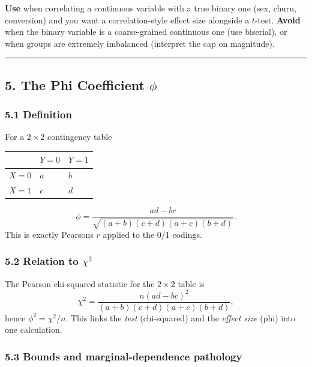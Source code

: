 \documentclass{article}
\begin{document}
\textbf{Use} when correlating a continuous variable with a true binary
one (sex, churn, conversion) and you want a correlation-style effect
size alongside a \(t\)-test. \textbf{Avoid} when the binary variable is
a coarse-grained continuous one (use biserial), or when groups are
extremely imbalanced (interpret the cap on magnitude).

\begin{center}\rule{0.5\linewidth}{0.5pt}\end{center}

\subsection{\texorpdfstring{5. The Phi Coefficient
\(\phi\)}{5. The Phi Coefficient \textbackslash phi}}\label{5-the-phi-coefficient-phi}

\subsubsection{5.1 Definition}\label{51-definition}

For a \(2 \times 2\) contingency table

{\def\LTcaptype{none} %
\begin{longtable}[]{@{}lll@{}}
\toprule\noalign{}
& \(Y = 0\) & \(Y = 1\) \\
\midrule\noalign{}
\endhead
\bottomrule\noalign{}
\endlastfoot
\(X = 0\) & \(a\) & \(b\) \\
\(X = 1\) & \(c\) & \(d\) \\
\end{longtable}
}

\[
\phi = \frac{ad - bc}{\sqrt{(a+b)(c+d)(a+c)(b+d)}}.
\] This is exactly Pearson\textquotesingle s \(r\) applied to the 0/1
codings.

\subsubsection{\texorpdfstring{5.2 Relation to
\(\chi^2\)}{5.2 Relation to \textbackslash chi\^{}2}}\label{52-relation-to-chi2}

The Pearson chi-squared statistic for the \(2 \times 2\) table is \[
\chi^2 = \frac{n(ad - bc)^2}{(a+b)(c+d)(a+c)(b+d)},
\] hence \(\phi^2 = \chi^2 / n\). This links the \emph{test}
(chi-squared) and the \emph{effect size} (phi) into one calculation.

\subsubsection{5.3 Bounds and marginal-dependence
pathology}\label{53-bounds-and-marginal-dependence-pathology}
\end{document}
